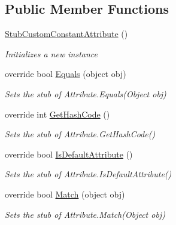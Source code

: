 \subsection*{Public Member Functions}
\begin{DoxyCompactItemize}
\item 
\hyperlink{class_system_1_1_runtime_1_1_compiler_services_1_1_fakes_1_1_stub_custom_constant_attribute_a15593907cfa3bbefc653b4b607ba8bfc}{Stub\-Custom\-Constant\-Attribute} ()
\begin{DoxyCompactList}\small\item\em Initializes a new instance\end{DoxyCompactList}\item 
override bool \hyperlink{class_system_1_1_runtime_1_1_compiler_services_1_1_fakes_1_1_stub_custom_constant_attribute_a0e73a4a3b1b62ab0dd948fc2f2b9e27d}{Equals} (object obj)
\begin{DoxyCompactList}\small\item\em Sets the stub of Attribute.\-Equals(\-Object obj)\end{DoxyCompactList}\item 
override int \hyperlink{class_system_1_1_runtime_1_1_compiler_services_1_1_fakes_1_1_stub_custom_constant_attribute_a9db40543b8396a598a63ae04844138ec}{Get\-Hash\-Code} ()
\begin{DoxyCompactList}\small\item\em Sets the stub of Attribute.\-Get\-Hash\-Code()\end{DoxyCompactList}\item 
override bool \hyperlink{class_system_1_1_runtime_1_1_compiler_services_1_1_fakes_1_1_stub_custom_constant_attribute_a6703bf0a721387cb729f5ac18d380f69}{Is\-Default\-Attribute} ()
\begin{DoxyCompactList}\small\item\em Sets the stub of Attribute.\-Is\-Default\-Attribute()\end{DoxyCompactList}\item 
override bool \hyperlink{class_system_1_1_runtime_1_1_compiler_services_1_1_fakes_1_1_stub_custom_constant_attribute_a2fa53e0d30273c2a50c37f6b37719954}{Match} (object obj)
\begin{DoxyCompactList}\small\item\em Sets the stub of Attribute.\-Match(\-Object obj)\end{DoxyCompactList}\end{DoxyCompactItemize}
